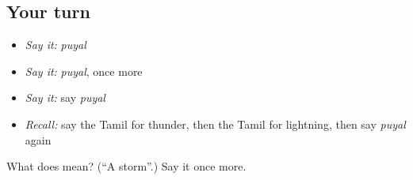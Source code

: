 \subsection*{Your turn}
\begin{itemize}
\raggedright
  \item \emph{Say it:} \emph{puyal}
  \item \emph{Say it:} \emph{puyal}, once more
  \item \emph{Say it:} say \emph{puyal}
  \item \emph{Recall:} say the Tamil for thunder, then the Tamil for lightning, then say \emph{puyal} again
\end{itemize}

\begin{tcolorbox}[breakable,colback=teal!4,colframe=teal!35!black,title={Before you move on}]
What does  mean? (\textquotedblleft{}A storm\textquotedblright{}.) Say it once more.
\end{tcolorbox}
